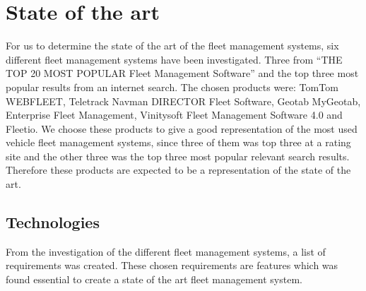\section{State of the art}
For us to determine the state of the art of the fleet management systems, six different fleet management systems have been investigated.
Three from ``THE TOP 20 MOST POPULAR Fleet Management Software''\cite{top20fleetmanagement} and the top three most popular results from an internet search.
The chosen products were: TomTom WEBFLEET\cite{tomtom}, Teletrack Navman DIRECTOR Fleet Software\cite{teletracnavman}, Geotab MyGeotab\cite{geotab}, Enterprise Fleet Management\cite{efleets}, Vinitysoft Fleet Management Software 4.0\cite{vinitysoft} and Fleetio\cite{fleetio}. 
We choose these products to give a good representation of the most used vehicle fleet management systems, since three of them was top three at a rating site and the other three was the top three most popular relevant search results.
Therefore these products are expected to be a representation of the state of the art.

\subsection*{Technologies}
From the investigation of the different fleet management systems, a list of requirements was created.
These chosen requirements are features which was found essential to create a state of the art fleet management system.

